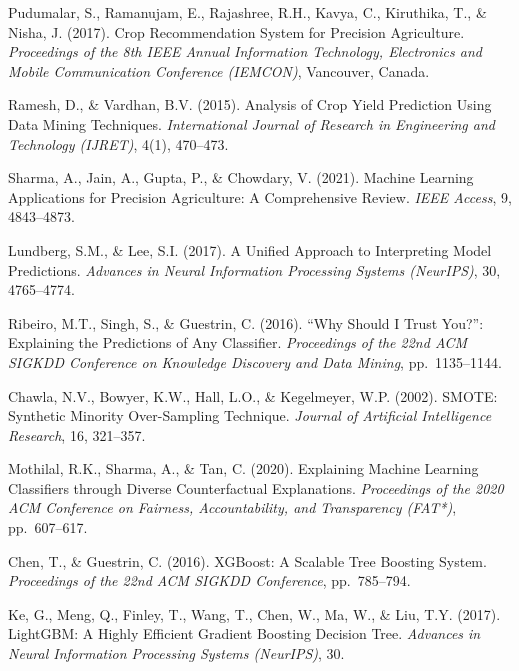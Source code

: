 \documentclass[12pt,a4paper,oneside]{report}
\begin{document}
\begin{enumerate}[leftmargin=*, label={[\arabic*]}]

\item Pudumalar, S., Ramanujam, E., Rajashree, R.H., Kavya, C., Kiruthika, T., \& Nisha, J. (2017). Crop Recommendation System for Precision Agriculture. \textit{Proceedings of the 8th IEEE Annual Information Technology, Electronics and Mobile Communication Conference (IEMCON)}, Vancouver, Canada.

\item Ramesh, D., \& Vardhan, B.V. (2015). Analysis of Crop Yield Prediction Using Data Mining Techniques. \textit{International Journal of Research in Engineering and Technology (IJRET)}, 4(1), 470--473.

\item Sharma, A., Jain, A., Gupta, P., \& Chowdary, V. (2021). Machine Learning Applications for Precision Agriculture: A Comprehensive Review. \textit{IEEE Access}, 9, 4843--4873.

\item Lundberg, S.M., \& Lee, S.I. (2017). A Unified Approach to Interpreting Model Predictions. \textit{Advances in Neural Information Processing Systems (NeurIPS)}, 30, 4765--4774.

\item Ribeiro, M.T., Singh, S., \& Guestrin, C. (2016). ``Why Should I Trust You?'': Explaining the Predictions of Any Classifier. \textit{Proceedings of the 22nd ACM SIGKDD Conference on Knowledge Discovery and Data Mining}, pp.\ 1135--1144.

\item Chawla, N.V., Bowyer, K.W., Hall, L.O., \& Kegelmeyer, W.P. (2002). SMOTE: Synthetic Minority Over-Sampling Technique. \textit{Journal of Artificial Intelligence Research}, 16, 321--357.

\item Mothilal, R.K., Sharma, A., \& Tan, C. (2020). Explaining Machine Learning Classifiers through Diverse Counterfactual Explanations. \textit{Proceedings of the 2020 ACM Conference on Fairness, Accountability, and Transparency (FAT*)}, pp.\ 607--617.

\item Chen, T., \& Guestrin, C. (2016). XGBoost: A Scalable Tree Boosting System. \textit{Proceedings of the 22nd ACM SIGKDD Conference}, pp.\ 785--794.

\item Ke, G., Meng, Q., Finley, T., Wang, T., Chen, W., Ma, W., \& Liu, T.Y. (2017). LightGBM: A Highly Efficient Gradient Boosting Decision Tree. \textit{Advances in Neural Information Processing Systems (NeurIPS)}, 30.


\end{enumerate}
\end{document}
